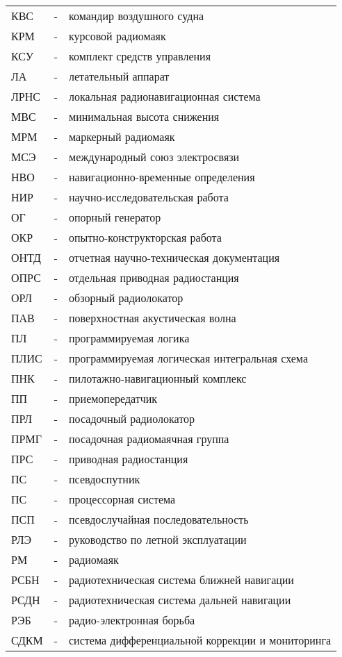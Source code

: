 \begin{longtable}{lll}
КВС  & - & командир воздушного судна \\ 
КРМ  & - & курсовой радиомаяк \\ 
КСУ  & - & комплект средств управления \\ 
ЛА   & - & летательный аппарат \\ 
ЛРНС & - & локальная радионавигационная система \\ 
МВС  & - & минимальная высота снижения \\
МРМ  & - & маркерный радиомаяк \\
МСЭ  & - & международный союз электросвязи \\
НВО  & - & навигационно-временные определения \\
НИР  & - & научно-исследовательская работа \\
ОГ   & - & опорный генератор \\
ОКР  & - & опытно-конструкторская работа \\
ОНТД & - & отчетная научно-техническая документация \\
ОПРС & - & отдельная приводная радиостанция \\
ОРЛ  & - & обзорный радиолокатор \\
ПАВ  & - & поверхностная акустическая волна \\
ПЛ   & - & программируемая логика \\
ПЛИС & - & программируемая логическая интегральная схема \\
ПНК  & - & пилотажно-навигационный комплекс \\
ПП   & - & приемопередатчик \\
ПРЛ  & - & посадочный радиолокатор \\
ПРМГ & - & посадочная радиомаячная группа \\
ПРС  & - & приводная радиостанция \\
ПС   & - & псевдоспутник \\
ПС   & - & процессорная система \\
ПСП  & - & псевдослучайная последовательность \\
РЛЭ  & - & руководство по летной эксплуатации \\
РМ   & - & радиомаяк \\
РСБН & - & радиотехническая система ближней навигации \\
РСДН & - & радиотехническая система дальней навигации \\
РЭБ  & - & радио-электронная борьба \\
СДКМ & - & система дифференциальной коррекции и мониторинга \\

\end{longtable}
